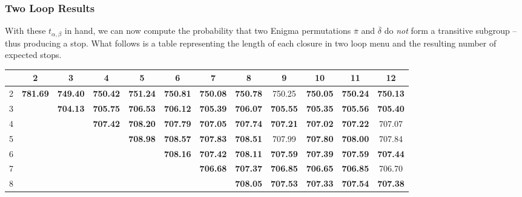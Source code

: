 \subsubsection{Two Loop Results}
With these $t_{\alpha, \beta}$ in hand, we can now compute the
probability that two Enigma permutations $\overline\pi$ and
$\overline\delta$ do \emph{not} form a transitive subgroup -- thus
producing a stop. What follows is a table representing the length of
each closure in two loop menu and the resulting number of expected stops.
\begin{table}[H]
  \centering
  \begin{adjustbox}{max width=\textwidth,max height=2\textheight}
\begin{tabular}{|c|c|c|c|c|c|c|c|c|c|c|c|}
  \hline
  & 2       & 3       & 4       & 5       & 6       & 7       & 8       & 9       & 10      & 11      & 12      \\
  \hline
  2 & \textbf{781.69} & \textbf{749.40} & \textbf{750.42} & \textbf{751.24} & \textbf{750.81} & \textbf{750.08} & \textbf{750.78} & 750.25 & \textbf{750.05} & \textbf{750.24} & \textbf{750.13} \\
  \hline
  3 &               & \textbf{704.13} & \textbf{705.75} & \textbf{706.53} & \textbf{706.12} & \textbf{705.39} & \textbf{706.07} & \textbf{705.55} & \textbf{705.35} & \textbf{705.56} & \textbf{705.40} \\
  \hline
  4 &               &               & \textbf{707.42} & \textbf{708.20} & \textbf{707.79} & \textbf{707.05} & \textbf{707.74} & \textbf{707.21} & \textbf{707.02} & \textbf{707.22} & 707.07 \\
  \hline
  5 &               &               &               & \textbf{708.98} & \textbf{708.57} & \textbf{707.83} & \textbf{708.51} & 707.99 & \textbf{707.80} & \textbf{708.00} & 707.84 \\
  \hline
  6 &               &               &               &               & \textbf{708.16} & \textbf{707.42} & \textbf{708.11} & \textbf{707.59} & \textbf{707.39} & \textbf{707.59} & \textbf{707.44} \\
  \hline
  7 &               &               &               &               &               & \textbf{706.68} & \textbf{707.37} & \textbf{706.85} & \textbf{706.65} & \textbf{706.85} & 706.70 \\
  \hline
  8 &               &               &               &               &               &               & \textbf{708.05} & \textbf{707.53} & \textbf{707.33} & \textbf{707.54} & \textbf{707.38} \\

\end{tabular}
\end{adjustbox}
\end{table}
